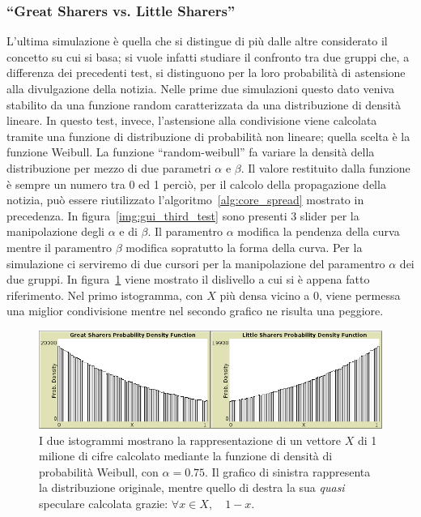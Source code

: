 \subsubsection{``Great Sharers vs. Little Sharers''}
\label{section:great_sharers_vs_little_sharers}

L'ultima simulazione è quella che si distingue di più dalle altre considerato il concetto su cui si basa;
si vuole infatti studiare il confronto tra due gruppi che, a differenza dei precedenti test, si distinguono 
per la loro probabilità di astensione alla divulgazione della notizia. 
Nelle prime due simulazioni questo dato veniva stabilito da una funzione random caratterizzata da una distribuzione di
densità lineare.
In questo test, invece, l'astensione alla condivisione viene calcolata tramite una funzione di distribuzione di probabilità non lineare; 
quella scelta è la funzione Weibull\cite{biblio:weibull}.
La funzione ``random-weibull'' fa variare la densità della distribuzione per mezzo di due parametri $\alpha$ e $\beta$.
Il valore restituito dalla funzione è sempre un numero tra 0 ed 1 perciò, per il calcolo della propagazione della notizia,
può essere riutilizzato l'algoritmo~\ref{alg:core_spread} mostrato in precedenza.
In figura~\ref{img:gui_third_test} sono presenti 3 slider per la manipolazione degli $\alpha$ e di $\beta$. 
Il paramentro $\alpha$ modifica la pendenza della curva mentre il paramentro $\beta$ modifica sopratutto la forma della curva.
Per la simulazione ci serviremo di due cursori per la manipolazione del paramentro $\alpha$ dei due gruppi.
In figura~\ref{img:weibull_alpha_0_75} viene mostrato il dislivello a cui si è appena fatto riferimento.
Nel primo istogramma, con $X$ più densa vicino a 0, viene permessa una miglior condivisione mentre nel secondo grafico ne risulta una peggiore.


\begin{figure}[!htb]
\centerline {
  \includegraphics[width=1.1\textwidth]{img/weibull-alpha-0.75.png}
}
\caption[caption for img/weibull-alpha-0.75.png]{I due istogrammi mostrano la rappresentazione di un vettore $X$ di 1 milione di cifre 
calcolato mediante la funzione di densità di probabilità Weibull, con $\alpha = 0.75$.
Il grafico di sinistra rappresenta la distribuzione originale, 
mentre quello di destra la sua \emph{quasi \protect\footnotemark} speculare calcolata grazie: $\forall x \in X, \quad 1 - x$.}
\label{img:weibull_alpha_0_75}
\end{figure}

